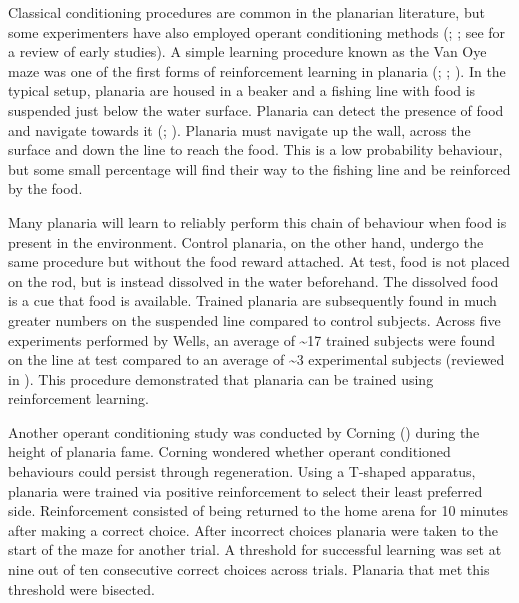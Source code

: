 \documentclass[
  jou,
  floatsintext,
  longtable,
  nolmodern,
  notxfonts,
  notimes,
  donotrepeattitle,
  colorlinks=true,linkcolor=blue,citecolor=blue,urlcolor=blue]{apa7}
\begin{document}
Classical conditioning procedures are common in the planarian
literature, but some experimenters have also employed operant
conditioning methods
(;
; see
 for a review of early
studies). A simple learning procedure known as the Van Oye maze was one
of the first forms of reinforcement learning in planaria
(;
;
). In the typical setup,
planaria are housed in a beaker and a fishing line with food is
suspended just below the water surface. Planaria can detect the presence
of food and navigate towards it (; ). Planaria must navigate up the wall, across the
surface and down the line to reach the food. This is a low probability
behaviour, but some small percentage will find their way to the fishing
line and be reinforced by the food.

Many planaria will learn to reliably perform this chain of behaviour
when food is present in the environment. Control planaria, on the other
hand, undergo the same procedure but without the food reward attached.
At test, food is not placed on the rod, but is instead dissolved in the
water beforehand. The dissolved food is a cue that food is available.
Trained planaria are subsequently found in much greater numbers on the
suspended line compared to control subjects. Across five experiments
performed by Wells, an average of \textasciitilde17 trained subjects
were found on the line at test compared to an average of
\textasciitilde3 experimental subjects (reviewed in
). This
procedure demonstrated that planaria can be trained using reinforcement
learning.

Another operant conditioning study was conducted by Corning
() during the height of
planaria fame. Corning wondered whether operant conditioned behaviours
could persist through regeneration. Using a T-shaped apparatus, planaria
were trained via positive reinforcement to select their least preferred
side. Reinforcement consisted of being returned to the home arena for 10
minutes after making a correct choice. After incorrect choices planaria
were taken to the start of the maze for another trial. A threshold for
successful learning was set at nine out of ten consecutive correct
choices across trials. Planaria that met this threshold were bisected.
\end{document}
